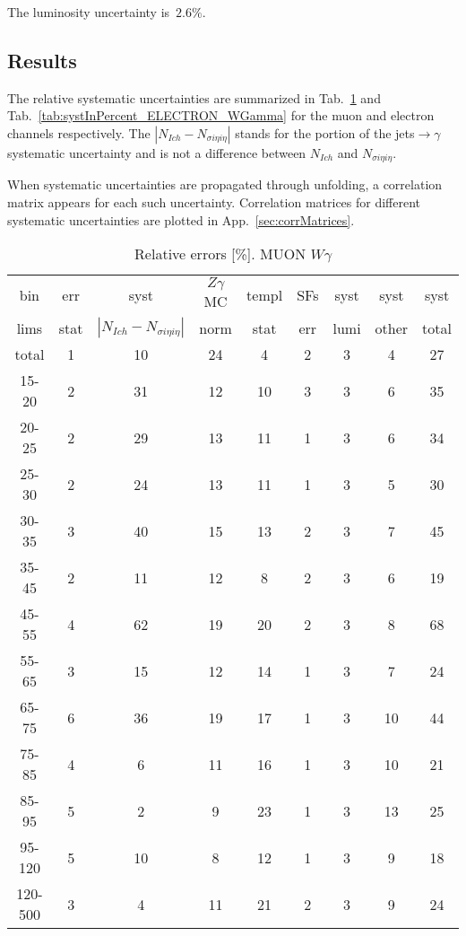 
The luminosity uncertainty is~$2.6\%$.

\subsection{Results}

The relative systematic uncertainties are summarized in Tab.~\ref{tab:systInPercent_MUON_WGamma} and Tab.~\ref{tab:systInPercent_ELECTRON_WGamma} for the muon and electron channels respectively. The $|N_{Ich}-N_{\sigma{i\eta i\eta}}|$ stands for the portion of the jets$\rightarrow\gamma$ systematic uncertainty and is not a difference between $N_{Ich}$ and $N_{\sigma{i\eta i\eta}}$.

When systematic uncertainties are propagated through unfolding, a correlation matrix appears for each such uncertainty. Correlation matrices for different systematic uncertainties are plotted in App.~\ref{sec:corrMatrices}.

\begin{table}[h]
  \scriptsize
  \begin{center}
  \caption{Relative errors [\%]. MUON $W\gamma$}
   \begin{tabular}{|c|c|c|c|c|c|c|c|c|}
    bin  & err & syst & $Z\gamma$ MC & templ & SFs & syst & syst & syst\\
    lims  & stat & $|N_{Ich}-N_{\sigma{i\eta i\eta}}|$ & norm & stat & err & lumi & other & total\\ \hline
    total  & 1 & 10 & 24 & 4 & 2 & 3 & 4 & 27 \\ \hline
    15-20 & 2 & 31 & 12 & 10 & 3 & 3 & 6 & 35 \\ \hline
    20-25 & 2 & 29 & 13 & 11 & 1 & 3 & 6 & 34 \\ \hline
    25-30 & 2 & 24 & 13 & 11 & 1 & 3 & 5 & 30 \\ \hline
    30-35 & 3 & 40 & 15 & 13 & 2 & 3 & 7 & 45 \\ \hline
    35-45 & 2 & 11 & 12 & 8 & 2 & 3 & 6 & 19 \\ \hline
    45-55 & 4 & 62 & 19 & 20 & 2 & 3 & 8 & 68 \\ \hline
    55-65 & 3 & 15 & 12 & 14 & 1 & 3 & 7 & 24 \\ \hline
    65-75 & 6 & 36 & 19 & 17 & 1 & 3 & 10 & 44 \\ \hline
    75-85 & 4 & 6 & 11 & 16 & 1 & 3 & 10 & 21 \\ \hline
    85-95 & 5 & 2 & 9 & 23 & 1 & 3 & 13 & 25 \\ \hline
    95-120 & 5 & 10 & 8 & 12 & 1 & 3 & 9 & 18 \\ \hline
    120-500 & 3 & 4 & 11 & 21 & 2 & 3 & 9 & 24 \\ \hline
  \end{tabular}
  \label{tab:systInPercent_MUON_WGamma}
  \end{center}
\end{table}


